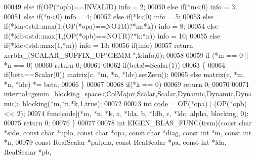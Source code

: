 \begin{DoxyCode}
00049   \textcolor{keywordflow}{else} \textcolor{keywordflow}{if}(OP(*opb)==INVALID)                                          info = 2;
00050   \textcolor{keywordflow}{else} \textcolor{keywordflow}{if}(*m<0)                                                       info = 3;
00051   \textcolor{keywordflow}{else} \textcolor{keywordflow}{if}(*n<0)                                                       info = 4;
00052   \textcolor{keywordflow}{else} \textcolor{keywordflow}{if}(*k<0)                                                       info = 5;
00053   \textcolor{keywordflow}{else} \textcolor{keywordflow}{if}(*lda<std::max(1,(OP(*opa)==NOTR)?*m:*k))                    info = 8;
00054   \textcolor{keywordflow}{else} \textcolor{keywordflow}{if}(*ldb<std::max(1,(OP(*opb)==NOTR)?*k:*n))                    info = 10;
00055   \textcolor{keywordflow}{else} \textcolor{keywordflow}{if}(*ldc<std::max(1,*m))                                        info = 13;
00056   \textcolor{keywordflow}{if}(info)
00057     \textcolor{keywordflow}{return} xerbla\_(SCALAR\_SUFFIX\_UP\textcolor{stringliteral}{"GEMM "},&info,6);
00058 
00059   \textcolor{keywordflow}{if} (*m == 0 || *n == 0)
00060     \textcolor{keywordflow}{return} 0;
00061 
00062   \textcolor{keywordflow}{if}(beta!=Scalar(1))
00063   \{
00064     \textcolor{keywordflow}{if}(beta==Scalar(0)) matrix(c, *m, *n, *ldc).setZero();
00065     \textcolor{keywordflow}{else}                matrix(c, *m, *n, *ldc) *= beta;
00066   \}
00067 
00068   \textcolor{keywordflow}{if}(*k == 0)
00069     \textcolor{keywordflow}{return} 0;
00070 
00071   internal::gemm\_blocking\_space<ColMajor,Scalar,Scalar,Dynamic,Dynamic,Dynamic> blocking(*m,*n,*k,1,\textcolor{keyword}{true});
00072 
00073   \textcolor{keywordtype}{int} \hyperlink{structcode}{code} = OP(*opa) | (OP(*opb) << 2);
00074   func[code](*m, *n, *k, a, *lda, b, *ldb, c, *ldc, alpha, blocking, 0);
00075   \textcolor{keywordflow}{return} 0;
00076 \}
00077 
00078 \textcolor{keywordtype}{int} EIGEN\_BLAS\_FUNC(trsm)(\textcolor{keyword}{const} \textcolor{keywordtype}{char} *side, \textcolor{keyword}{const} \textcolor{keywordtype}{char} *uplo, \textcolor{keyword}{const} \textcolor{keywordtype}{char} *opa, \textcolor{keyword}{const} \textcolor{keywordtype}{char} *diag, \textcolor{keyword}{const} \textcolor{keywordtype}{int} 
      *m, \textcolor{keyword}{const} \textcolor{keywordtype}{int} *n,
00079                           \textcolor{keyword}{const} RealScalar *palpha,  \textcolor{keyword}{const} RealScalar *pa, \textcolor{keyword}{const} \textcolor{keywordtype}{int} *lda, RealScalar *pb, \textcolor{keyword}{
}
\end{DoxyCode}
